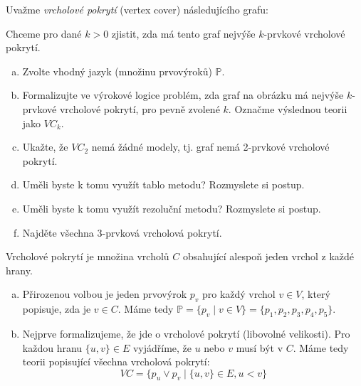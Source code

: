 \documentclass[a4paper,11pt]{amsart}
\begin{document}
\begin{problem}

    Uvažme \emph{vrcholové pokrytí} (vertex cover) následujícího grafu:    
    \begin{center}
    \end{center}
    Chceme pro dané $k>0$ zjistit, zda má tento graf nejvýše $k$-prvkové vrcholové pokrytí.

    \begin{enumerate}[(a)]
        \item Zvolte vhodný jazyk (množinu prvovýroků) $\mathbb P$.
        \item Formalizujte ve výrokové logice problém, zda graf na obrázku má nejvýše $k$-prvkové vrcholové pokrytí, pro pevně zvolené $k$. Označme výslednou teorii jako ${VC}_k$.
        \item Ukažte, že ${VC}_2$ nemá žádné modely, tj. graf nemá 2-prvkové vrcholové pokrytí.
        \item Uměli byste k tomu využít tablo metodu? Rozmyslete si postup.
        \item Uměli byste k tomu využít rezoluční metodu? Rozmyslete si postup.
        \item Najděte všechna 3-prvková vrcholová pokrytí.            
    \end{enumerate}

    \begin{solution}
        Vrcholové pokrytí je množina vrcholů $C$ obsahující alespoň jeden vrchol z každé hrany.
        \begin{enumerate}[(a)]
            \item Přirozenou volbou je jeden prvovýrok $p_v$ pro každý vrchol $v\in V$, který popisuje, zda je $v\in C$. Máme tedy $\mathbb P=\{p_v\mid v\in V\}=\{p_1,p_2,p_3,p_4,p_5\}$.
            \item Nejprve formalizujeme, že jde o vrcholové pokrytí (libovolné velikosti). Pro každou hranu $\{u,v\}\in E$ vyjádříme, že $u$ nebo $v$ musí být v $C$. Máme tedy teorii popisující všechna vrcholová pokrytí:
            $$
            VC=\{p_u\lor p_v\mid \{u,v\}\in E, u<v\}
            $$
            

\end{enumerate}
\end{solution}
\end{problem}
\end{document}
